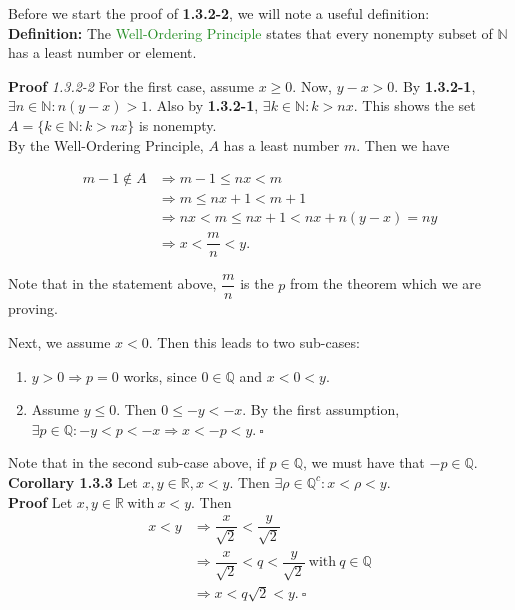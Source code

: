 \documentclass{article}
\begin{document}
Before we start the proof of \textbf{1.3.2-2}, we will note a useful definition:\\

\textbf{Definition:} The \textcolor{ForestGreen}{Well-Ordering Principle} states that every nonempty subset of $\mathbb{N}$ has a least number or element.

\textbf{Proof} \textit{1.3.2-2} For the first case, assume $x \geq 0$. Now, $y-x>0$. By \textbf{1.3.2-1}, $\exists n \in \mathbb{N}:n(y-x)>1$. Also by \textbf{1.3.2-1}, $\exists k \in \mathbb{N}: k>nx$. This shows the set $A=\{k \in \mathbb{N}: k>nx\}$ is nonempty. \\

By the Well-Ordering Principle, $A$ has a least number $m$. Then we have

\begin{align*}
    m-1 \notin A &\Longrightarrow m-1 \leq nx <m \\
    &\Longrightarrow m \leq nx+1 <m+1\\
    &\Longrightarrow nx<m\leq nx+1<nx+n(y-x)=ny\\
    &\Longrightarrow x<\dfrac{m}{n} <y.
\end{align*}

Note that in the statement above, $\dfrac{m}{n}$ is the $p$ from the theorem which we are proving.

Next, we assume $x<0$. Then this leads to two sub-cases:
\begin{enumerate}
    \item $y>0 \Longrightarrow p=0$ works, since $0 \in \mathbb{Q}$ and $x<0<y$.
    \item Assume $y \leq 0$. Then $0 \leq -y < -x$. By the first assumption, $\exists p \in \mathbb{Q}:-y<p<-x \Longrightarrow x < -p < y. \ \square$ 
\end{enumerate}

Note that in the second sub-case above, if $p \in \mathbb{Q}$, we must have that $-p \in \mathbb{Q}$.\\

\textbf{Corollary 1.3.3} Let $x,y \in \mathbb{R}, x < y$. Then $\exists \rho \in \mathbb{Q}^c:x<\rho<y$.\\

\textbf{Proof} Let $x,y \in \mathbb{R} \ \text{with} \ x < y$. Then 
\begin{align*}
    x < y &\Longrightarrow \dfrac{x}{\sqrt{2}} < \dfrac{y}{\sqrt{2}}\\
    &\Longrightarrow \dfrac{x}{\sqrt{2}} < q < \dfrac{y}{\sqrt{2}} \ \text{with} \ q \in \mathbb{Q}\\
    &\Longrightarrow x < q\sqrt{2} < y. \ \square
\end{align*}
\end{document}
